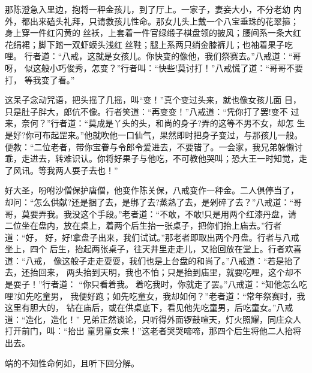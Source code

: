 那陈澄急入里边，抱将一秤金孩儿，到了厅上。一家子，妻妾大小，不分老幼
内外，都出来磕头礼拜，只请救孩儿性命。那女儿头上戴一个八宝垂珠的花翠箍；
身上穿一件红闪黄的丝袄，上套着一件官绿缎子棋盘领的披风；腰间系一条大红
花绢裙；脚下踏一双虾蟆头浅红丝鞋；腿上系两只绡金膝裤儿；也袖着果子吃哩。
行者道：“八戒，这就是女孩儿。你快变的像他，我们祭赛去。”八戒道：“哥呀，
似这般小巧俊秀，怎变？”行者叫：“快些!莫讨打！”八戒慌了道：“哥哥不要打，
等我变了看。”

这呆子念动咒语，把头摇了几摇，叫“变！”真个变过头来，就也像女孩儿面
目，只是肚子胖大，郎伉不像。行者笑道：“再变变！”八戒道：“凭你打了罢!变不
过来，奈何？”行者道：“莫成是丫头的头，和尚的身子?弄的这等不男不女，却怎
生是好?你可布起罡来。”他就吹他一口仙气，果然即时把身子变过，与那孩儿一般。
便教：“二位老者，带你宝眷与令郎令爱进去，不要错了。一会家，我兄弟躲懒讨
乖，走进去，转难识认。你将好果子与他吃，不可教他哭叫；恐大王一时知觉，走
了风讯。等我两人耍子去也！”

好大圣，吩咐沙僧保护唐僧，他变作陈关保，八戒变作一秤金。二人俱停当了，
却问：“怎么供献?还是捆了去，是绑了去?蒸熟了去，是剁碎了去？”八戒道：“哥
哥，莫要弄我。我没这个手段。”老者道：“不敢，不敢!只是用两个红漆丹盘，请
二位坐在盘内，放在桌上，着两个后生抬一张桌子，把你们抬上庙去。”行者道：“好，
好，好!拿盘子出来，我们试试。”那老者即取出两个丹盘。行者与八戒坐上，四个
后生，抬起两张桌子，往天井里走走儿，又抬回放在堂上。行者欢喜道：“八戒，
像这般子走走耍耍，我们也是上台盘的和尚了。”八戒道：“若是抬了去，还抬回来，
两头抬到天明，我也不怕；只是抬到庙里，就要吃哩，这个却不是耍子！”行者道：
“你只看着我。着吃我时，你就走了罢。”八戒道：“知他怎么吃哩?如先吃童男，
我便好跑；如先吃童女，我却如何？”老者道：“常年祭赛时，我这里有胆大的，
钻在庙后，或在供桌底下，看见他先吃童男，后吃童女。”八戒道：“造化，造化！”
兄弟正然谈论，只听得外面锣鼓喧天，灯火照耀，同庄众人打开前门，叫：“抬出
童男童女来！”这老者哭哭啼啼，那四个后生将他二人抬将出去。

端的不知性命何如，且听下回分解。